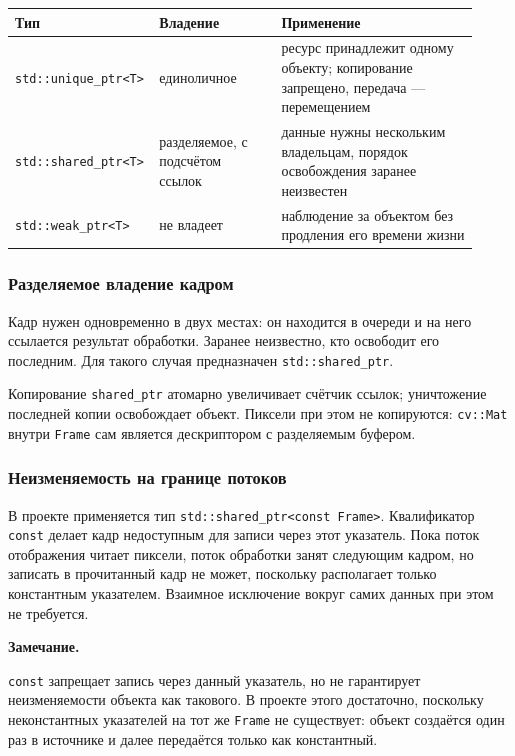 \documentclass[11pt,a4paper]{article}
\theoremstyle{definition}
\theoremstyle{remark}
\newenvironment{note}
  {\par\medskip\noindent
   \begin{lrbox}{\notebox}%
   \begin{minipage}{0.93\linewidth}%
   \small\textbf{Замечание.}\par\vspace{1pt}\noindent\ignorespaces}
  {\end{minipage}%
   \end{lrbox}%
   \fboxsep=6pt\relax
   \colorbox{codebg}{\usebox{\notebox}}%
   \par\medskip}
\begin{document}
\begin{center}
\begin{tabular}{p{0.24\linewidth}p{0.26\linewidth}p{0.42\linewidth}}
\toprule
Тип & Владение & Применение \\
\midrule
\texttt{std::unique\_ptr<T>} & единоличное & ресурс принадлежит одному
объекту; копирование запрещено, передача --- перемещением \\
\texttt{std::shared\_ptr<T>} & разделяемое, с подсчётом ссылок & данные нужны
нескольким владельцам, порядок освобождения заранее неизвестен \\
\texttt{std::weak\_ptr<T>} & не владеет & наблюдение за объектом без продления
его времени жизни \\
\bottomrule
\end{tabular}
\end{center}

\subsubsection{Разделяемое владение кадром}

Кадр нужен одновременно в двух местах: он находится в очереди и на него
ссылается результат обработки. Заранее неизвестно, кто освободит его
последним. Для такого случая предназначен \texttt{std::shared\_ptr}.

Копирование \texttt{shared\_ptr} атомарно увеличивает счётчик ссылок;
уничтожение последней копии освобождает объект. Пиксели при этом не
копируются: \texttt{cv::Mat} внутри \texttt{Frame} сам является дескриптором с
разделяемым буфером.

\subsubsection{Неизменяемость на границе потоков}

В проекте применяется тип \texttt{std::shared\_ptr<const Frame>}. Квалификатор
\texttt{const} делает кадр недоступным для записи через этот указатель. Пока
поток отображения читает пиксели, поток обработки занят следующим кадром, но
записать в прочитанный кадр не может, поскольку располагает только
константным указателем. Взаимное исключение вокруг самих данных при этом не
требуется.

\begin{note}
\texttt{const} запрещает запись через данный указатель, но не гарантирует
неизменяемости объекта как такового. В проекте этого достаточно, поскольку
неконстантных указателей на тот же \texttt{Frame} не существует: объект
создаётся один раз в источнике и далее передаётся только как константный.
\end{note}
\end{document}
